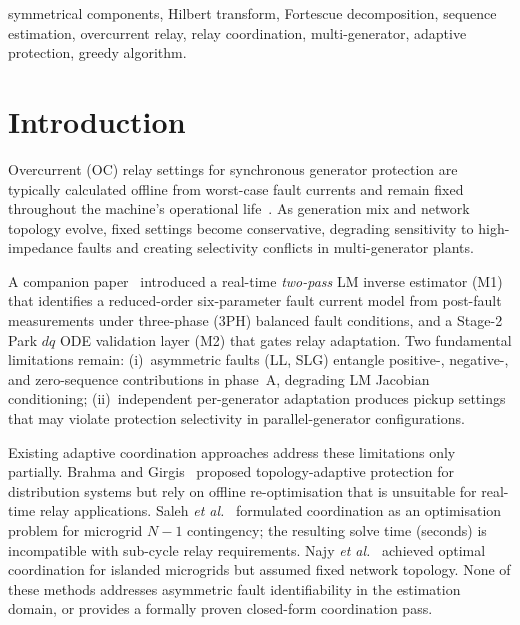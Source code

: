 \documentclass[journal,twoside,10pt]{IEEEtran}
\begin{document}
\begin{IEEEkeywords}
symmetrical components, Hilbert transform, Fortescue decomposition,
sequence estimation, overcurrent relay, relay coordination, multi-generator,
adaptive protection, greedy algorithm.
\end{IEEEkeywords}

\section{Introduction}
\label{sec:intro}

Overcurrent (OC) relay settings for synchronous generator protection are
typically calculated offline from worst-case fault currents and remain fixed
throughout the machine's operational life~\cite{Blackburn2006,Anderson1999}.
As generation mix and network topology evolve, fixed settings become
conservative, degrading sensitivity to high-impedance faults and creating
selectivity conflicts in multi-generator plants.

A companion paper~\cite{EluvathingalPaperA} introduced a real-time
\emph{two-pass} LM inverse estimator (M1) that identifies a reduced-order
six-parameter fault current model from post-fault measurements under
three-phase (3PH) balanced fault conditions, and a Stage-2 Park $dq$ ODE
validation layer (M2) that gates relay adaptation.
Two fundamental limitations remain: (i)~asymmetric faults (LL, SLG) entangle
positive-, negative-, and zero-sequence contributions in phase~A, degrading
LM Jacobian conditioning; (ii)~independent per-generator adaptation produces
pickup settings that may violate protection selectivity in parallel-generator
configurations.

Existing adaptive coordination approaches address these limitations only
partially.
Brahma and Girgis~\cite{Brahma2004} proposed topology-adaptive protection for
distribution systems but rely on offline re-optimisation that is unsuitable for
real-time relay applications.
Saleh \textit{et al.}~\cite{Saleh2017} formulated coordination as an
optimisation problem for microgrid $N{-}1$ contingency; the resulting
solve time (seconds) is incompatible with sub-cycle relay requirements.
Najy \textit{et al.}~\cite{Najy2013} achieved optimal coordination for
islanded microgrids but assumed fixed network topology.
None of these methods addresses asymmetric fault identifiability in the
estimation domain, or provides a formally proven closed-form coordination pass.
\end{document}
